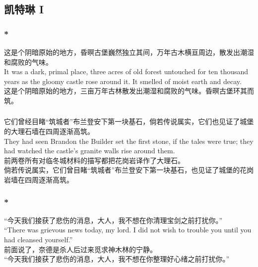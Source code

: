 \documentclass[12pt,a4paper]{article}
\begin{document}
\subsection{凯特琳 I}			
\subsubsection{\color{red}*}\label{1.2.1}{\color{blue}
这是个阴暗原始的地方，昏暝古堡巍然独立其间，万年古木横亘周边，散发出潮湿和腐败的气味。\\
It was a dark, primal place, three acres of old forest untouched for ten thousand years as the gloomy castle rose around it. It smelled of moist earth and decay.}\\
这是个阴暗原始的地方，三亩万年古林散发出潮湿和腐败的气味。昏暝古堡环其而筑。

\subsubsection{}{\color{blue}
它们曾经目睹“筑城者”布兰登安下第一块基石，倘若传说属实，它们也见证了城堡的大理石墙在四周逐渐高筑。\\
They had seen Brandon the Builder set the first stone, if the tales were true; they had watched the castle's granite walls rise around them.}\\
{\color{red}前两卷所有对临冬城材料的描写都把花岗岩译作了大理石。}\\
倘若传说属实，它们曾目睹“筑城者”布兰登安下第一块基石，也见证了城堡的花岗岩墙在四周逐渐高筑。

\subsubsection{\color{red}*}{\color{blue}
“今天我们接获了悲伤的消息，大人，我不想在你清理宝剑之前打扰你。”\\
“There was grievous news today, my lord. I did not wish to trouble you until you had cleansed yourself.” }\\
{\color{red}前面说了，奈德是杀人后过来觅求神木林的宁静。}\\
“今天我们接获了悲伤的消息，大人，我不想在你整理好心绪之前打扰你。”
			
\end{document}
